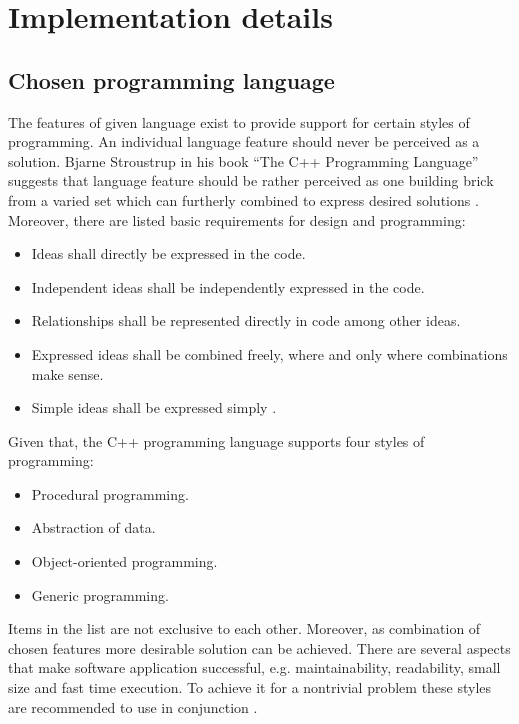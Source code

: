 
\section{Implementation details}

\subsection{Chosen programming language}

The features of given language exist to provide support for certain styles of programming. An individual
language feature should never be perceived as a solution. Bjarne Stroustrup in his book ``The C++ Programming Language''
suggests that language feature should be rather perceived as one building brick from a varied set which can
furtherly combined to express desired solutions \cite{cpp_language_bjarne}. Moreover, there are listed
basic requirements for design and programming:
\begin{itemize}
    \item Ideas shall directly be expressed in the code.
    \item Independent ideas shall be independently expressed in the code.
    \item Relationships shall be represented directly in code among other ideas.
    \item Expressed ideas shall be combined freely, where and only where combinations make sense.
    \item Simple ideas shall be expressed simply \cite{cpp_language_bjarne}.
\end{itemize}

Given that, the C++ programming language supports four styles of programming:
\begin{itemize}
    \item Procedural programming.
    \item Abstraction of data.
    \item Object-oriented programming.
    \item Generic programming.
\end{itemize}
Items in the list are not exclusive to each other. Moreover, as combination of chosen features
more desirable solution can be achieved. There are several aspects that make software application
successful, e.g. maintainability, readability, small size and fast time execution. To achieve it
for a nontrivial problem these styles are recommended to use in conjunction \cite{cpp_language_bjarne}.

